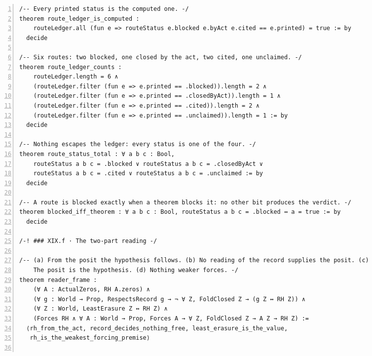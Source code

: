\documentclass[10pt]{article}
\newcommand{\leansize}{\fontsize{5.5pt}{6.75pt}\selectfont}
\begin{document}
\begin{multicols}{2}
\begin{Verbatim}[numbers=left,firstnumber=1,numbersep=3pt,xleftmargin=2.6em,breaklines=true,breakanywhere=true,breakautoindent=false,breakindent=1.4em,breaksymbolleft={},breakanywheresymbolpre={},fontsize=\leansize]
/-- Every printed status is the computed one. -/
theorem route_ledger_is_computed :
    routeLedger.all (fun e => routeStatus e.blocked e.byAct e.cited == e.printed) = true := by
  decide

/-- Six routes: two blocked, one closed by the act, two cited, one unclaimed. -/
theorem route_ledger_counts :
    routeLedger.length = 6 ∧
    (routeLedger.filter (fun e => e.printed == .blocked)).length = 2 ∧
    (routeLedger.filter (fun e => e.printed == .closedByAct)).length = 1 ∧
    (routeLedger.filter (fun e => e.printed == .cited)).length = 2 ∧
    (routeLedger.filter (fun e => e.printed == .unclaimed)).length = 1 := by
  decide

/-- Nothing escapes the ledger: every status is one of the four. -/
theorem route_status_total : ∀ a b c : Bool,
    routeStatus a b c = .blocked ∨ routeStatus a b c = .closedByAct ∨
    routeStatus a b c = .cited ∨ routeStatus a b c = .unclaimed := by
  decide

/-- A route is blocked exactly when a theorem blocks it: no other bit produces the verdict. -/
theorem blocked_iff_theorem : ∀ a b c : Bool, routeStatus a b c = .blocked ↔ a = true := by
  decide

/-! ### XIX.f · The two-part reading -/

/-- (a) From the posit the hypothesis follows. (b) No reading of the record supplies the posit. (c)
    The posit is the hypothesis. (d) Nothing weaker forces. -/
theorem reader_frame :
    (∀ A : ActualZeros, RH A.zeros) ∧
    (∀ g : World → Prop, RespectsRecord g → ¬ ∀ Z, FoldClosed Z → (g Z ↔ RH Z)) ∧
    (∀ Z : World, LeastErasure Z ↔ RH Z) ∧
    (Forces RH ∧ ∀ A : World → Prop, Forces A → ∀ Z, FoldClosed Z → A Z → RH Z) :=
  ⟨rh_from_the_act, record_decides_nothing_free, least_erasure_is_the_value,
   rh_is_the_weakest_forcing_premise⟩


\end{Verbatim}
\end{multicols}
\end{document}
